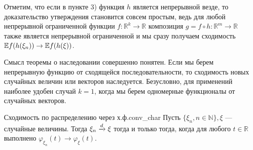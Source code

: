\begin{remark}[Замечание 5.2]
    Отметим, что если в пункте 3) функция $h$ является непрерывной везде, то доказательство утверждения становится совсем простым, ведь для любой непрерывной ограниченной функции $f : \mathbb{R}^k \to \mathbb{R}$ композиция $g = f \circ h : \mathbb{R}^m \to \mathbb{R}$ также является непрерывной ограниченной и мы сразу получаем сходимость $\mathbb{E} f(h(\xi_n)) \to \mathbb{E} f(h(\xi))$.
\end{remark}

\vspace{1em}
Смысл теоремы о наследовании совершенно понятен. Если мы берем непрерывную функцию от сходящейся последовательности, то сходимость новых случайных величин или векторов наследуется. Безусловно, для применений наиболее удобен случай $k = 1$, когда мы берем одномерные функционалы от случайных векторов.

\begin{corollary}{Сходимость по распределению через х.ф.}{conv_char}
    Пусть $\{\xi_n, n \in \mathbb{N}\}, \xi$ --- случайные величины. Тогда $\xi_n \xrightarrow{d} \xi$ тогда и только тогда, когда для любого $t \in \mathbb{R}$ выполнено $\varphi_{\xi_n}(t) \to \varphi_\xi(t)$.
\end{corollary}
